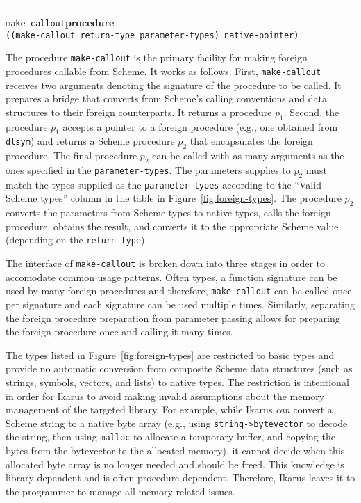 \documentclass[onecolumn, 12pt, twoside, openright, dvipdfm]{book}
\makeatletter
\newcommand{\idxlabeldefun}[5]{
\vspace{1ex}
\rule{\textwidth}{2pt}
{\phantomsection\index{#1@\texttt{#2}}\label{#3}{\Large\texttt{#4}}\hfill\textbf{#5}}\\}
\newcommand{\idxdefun}[3]{\idxlabeldefun{#1}{#2}{#1}{#2}{#3}}
\newcommand{\defun}[2]{\idxdefun{#1}{#1}{#2}}
\makeatother
\begin{document}
\defun{make-callout}{procedure}
\texttt{((make-callout return-type parameter-types) native-pointer)}

The procedure \texttt{make-callout} is the primary facility for
making foreign procedures callable from Scheme.  It works as
follows.  First, \texttt{make-callout} receives two arguments
denoting the signature of the procedure to be called.  It prepares a
bridge that converts from Scheme's calling conventions and data
structures to their foreign counterparts.  It returns a procedure
$p_1$.  Second, the procedure $p_1$ accepts a pointer to a foreign
procedure (e.g., one obtained from \texttt{dlsym}) and returns a
Scheme procedure $p_2$ that encapsulates the foreign procedure.  The
final procedure $p_2$ can be called with as many arguments as the
ones specified in the \texttt{parameter-types}.  The parameters
supplies to $p_2$ must match the types supplied as the
\texttt{parameter-types} according to the ``Valid Scheme types''
column in the table in Figure~\ref{fig:foreign-types}.  The
procedure $p_2$ converts the parameters from Scheme types to native
types, calls the foreign procedure, obtains the result, and converts
it to the appropriate Scheme value (depending on the
\texttt{return-type}).

The interface of \texttt{make-callout} is broken down into three
stages in order to accomodate common usage patterns.  Often types, a
function signature can be used by many foreign procedures and
therefore, \texttt{make-callout} can be called once per signature
and each signature can be used multiple times.  Similarly,
separating the foreign procedure preparation from parameter passing
allows for preparing the foreign procedure once and calling it many
times. 

The types listed in Figure~\ref{fig:foreign-types} are restricted to
basic types and provide no automatic conversion from composite
Scheme data structures (such as strings, symbols, vectors, and
lists) to native types.  The restriction is intentional in order for
Ikarus to avoid making invalid assumptions about the memory
management of the targeted library.  For example, while Ikarus
\emph{can} convert a Scheme string to a native byte array (e.g.,
using \texttt{string->bytevector} to decode the string, then using
\texttt{malloc} to allocate a temporary buffer, and copying the
bytes from the bytevector to the allocated memory), it cannot decide
when this allocated byte array is no longer needed and should be
freed.  This knowledge is library-dependent and is often
procedure-dependent.  Therefore, Ikarus leaves it to the programmer
to manage all memory related issues.
\end{document}
